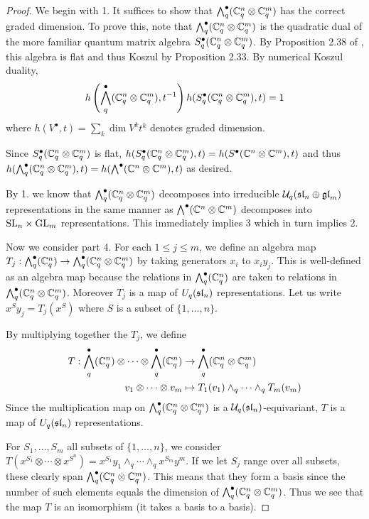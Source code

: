 \documentclass[11pt,leqno]{article}
\begin{document}
\begin{proof}
We begin with 1. It suffices to show that $ \Alt^\bullet_q(\bC_q^n \otimes \bC_q^m) $   has the correct graded dimension.  To prove this, note that $\Alt^\bullet_q(\bC_q^n \otimes \bC_q^m) $ is the quadratic dual of the more familiar quantum matrix algebra $ S_q^\bullet (\bC_q^n \otimes \bC_q^m) $.  By Proposition 2.38 of \cite{BW}, this algebra is flat and thus Koszul by Proposition 2.33.  By numerical Koszul duality,
    $$ h\left(\Alt^\bullet_q( \bC_q^n \otimes \bC_q^m), t^{-1}\right) h(S^\bullet_q (\bC_q^n \otimes \bC_q^m), t) = 1 $$ 
    where $ h(V^\bullet, t) = \sum_k \dim V^k t^k $ denotes graded dimension.
    
    Since $ S^\bullet_q (\bC_q^n \otimes \bC_q^m) $ is flat, $ h(S^\bullet_q (\bC_q^n \otimes \bC_q^m), t) =  h(S^\bullet (\bC^n \otimes \bC^m), t) $ and thus  $ h(\Alt^\bullet_q (\bC_q^n \otimes \bC_q^m), t) =  h(\Alt^\bullet (\bC^n \otimes \bC^m), t)$ as desired.
    
By 1. we know that $ \Alt^\bullet_q(\bC_q^n \otimes \bC_q^m) $ decomposes into irreducible $ \Uq(\sl_n \oplus \gl_m) $ representations in the same manner as $ \Alt^\bullet(\bC^n \otimes \bC^m) $ decomposes into $ \SL_n \times \GL_m $ representations.  This immediately implies 3 which in turn implies 2.

Now we consider part 4.  For each $ 1 \le j \le m$, we define an algebra map
$T_j : \Alt^\bullet_q(\bC_q^n) \rightarrow \Alt^\bullet_q (\bC_q^n \otimes \bC_q^m) $ by taking generators $ x_i $ to $ x_i y_j$.  This is well-defined as an algebra map because the relations in $ \Alt^\bullet_q(\bC_q^n) $ are taken to relations in $\Alt^\bullet_q (\bC_q^n \otimes \bC_q^m)$.  Moreover $T_j $ is a map of $ U_q(\sl_n) $ representations.   Let us write $ x^S y_j = T_j(x^S) $ where $ S $ is a subset of $ \{ 1, \dots, n \} $.

By multiplying together the $ T_j $, we define
\begin{align*}
T : \Alt^\bullet_q(\bC_q^n) \otimes \cdots \otimes \Alt^\bullet_q(\bC_q^n) &\rightarrow \Alt_q^\bullet (\bC_q^n \otimes \bC_q^m) \\
v_1 \otimes \cdots \otimes v_m &\mapsto T_1(v_1) \wedge_q \cdots \wedge_q T_m(v_m)
\end{align*}
Since the multiplication map on $\Alt_q^\bullet (\bC_q^n \otimes \bC_q^m)  $ is a $\Uq(\sl_n)$-equivariant, $ T $ is a map of $ U_q(\sl_n) $ representations.

For $ S_1, \dots, S_m $ all subsets of $ \{1, \dots, n \} $, we consider $ T(x^{S_1} \otimes \cdots \otimes x^{S^n}) = x^{S_1} y_1 \wedge_q \cdots \wedge_q x^{S_m}y^m $.  If we let $ S_j $ range over all subsets, these clearly span $ \Alt_q^\bullet (\bC_q^n \otimes \bC_q^m) $.  This means that they form a basis since the number of such elements equals the dimension of $ \Alt_q^\bullet (\bC_q^n \otimes \bC_q^m) $.  Thus we see that the map $ T $ is an isomorphism (it takes a basis to a basis).
\end{proof}
\end{document}
